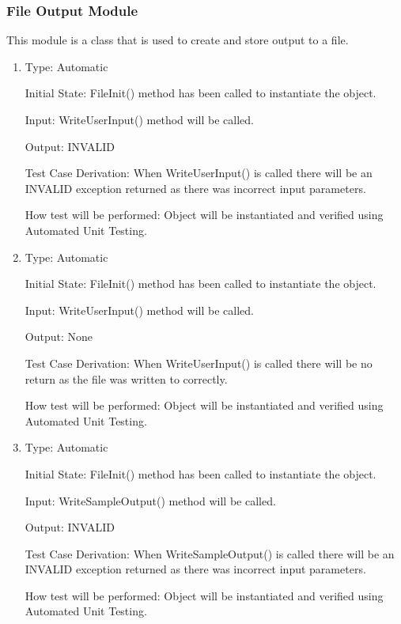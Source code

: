 \documentclass[12pt, titlepage]{article}
\begin{document}
\subsubsection{File Output Module}

This module is a class that is used to create and store output to a file.

\begin{enumerate}[{UT-FO}1.]

\item

Type: Automatic
					
Initial State: FileInit() method has been called to instantiate the object.
					
Input: WriteUserInput() method will be called.
					
Output: INVALID

Test Case Derivation: When WriteUserInput() is called there will be an INVALID exception returned as there was incorrect input parameters.

How test will be performed: Object will be instantiated and verified using Automated Unit Testing.
					
\item

Type: Automatic
					
Initial State: FileInit() method has been called to instantiate the object.
					
Input: WriteUserInput() method will be called.
					
Output: None

Test Case Derivation: When WriteUserInput() is called there will be no return as the file was written to correctly.

How test will be performed: Object will be instantiated and verified using Automated Unit Testing.

\item

Type: Automatic
					
Initial State: FileInit() method has been called to instantiate the object.
					
Input: WriteSampleOutput() method will be called.
					
Output: INVALID

Test Case Derivation: When WriteSampleOutput() is called there will be an INVALID exception returned as there was incorrect input parameters.

How test will be performed: Object will be instantiated and verified using Automated Unit Testing.
 


\end{enumerate}
\end{document}
